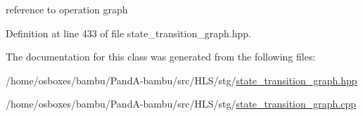 reference to operation graph 



Definition at line 433 of file state\+\_\+transition\+\_\+graph.\+hpp.



The documentation for this class was generated from the following files\+:\begin{DoxyCompactItemize}
\item 
/home/osboxes/bambu/\+Pand\+A-\/bambu/src/\+H\+L\+S/stg/\hyperlink{state__transition__graph_8hpp}{state\+\_\+transition\+\_\+graph.\+hpp}\item 
/home/osboxes/bambu/\+Pand\+A-\/bambu/src/\+H\+L\+S/stg/\hyperlink{state__transition__graph_8cpp}{state\+\_\+transition\+\_\+graph.\+cpp}\end{DoxyCompactItemize}
